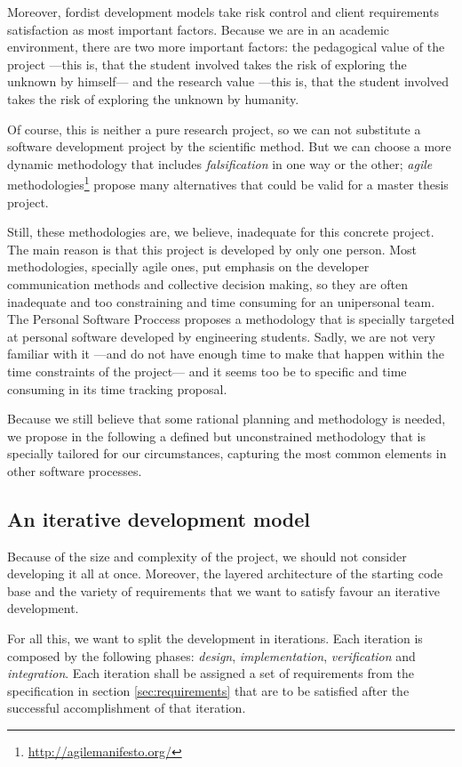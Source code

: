 Moreover, fordist development models take risk control and client
requirements satisfaction as most important factors. Because we are in
an academic environment, there are two more important factors: the
pedagogical value of the project ---this is, that the student involved
takes the risk of exploring the unknown by himself--- and the research
value ---this is, that the student involved takes the risk of
exploring the unknown by humanity.

Of course, this is neither a pure research project, so we can not
substitute a software development project by the scientific
method. But we can choose a more dynamic methodology that includes
\emph{falsification} in one way or the other; \emph{agile}
methodologies\footnote{\url{http://agilemanifesto.org/}} propose many
alternatives that could be valid for a master thesis project.

Still, these methodologies are, we believe, inadequate for this
concrete project. The main reason is that this project is developed by
only one person. Most methodologies, specially agile ones, put
emphasis on the developer communication methods and collective
decision making, so they are often inadequate and too constraining and
time consuming for an unipersonal team.  The Personal Software
Proccess \cite{watts96psp} proposes a methodology that is specially
targeted at personal software developed by engineering
students. Sadly, we are not very familiar with it ---and do not have
enough time to make that happen within the time constraints of the
project--- and it seems too be to specific and time consuming in its
time tracking proposal.

Because we still believe that some rational planning and methodology
is needed, we propose in the following a defined but unconstrained
methodology that is specially tailored for our circumstances,
capturing the most common elements in other software processes.

\subsection{An iterative development model}

Because of the size and complexity of the project, we should not
consider developing it all at once. Moreover, the layered architecture
of the starting code base and the variety of requirements that we want
to satisfy favour an iterative development.

For all this, we want to split the development in iterations. Each
iteration is composed by the following phases:  \emph{design},
\emph{implementation}, \emph{verification} and
\emph{integration}. Each iteration shall be assigned a set of
requirements from the specification in section \ref{sec:requirements}
that are to be satisfied after the successful accomplishment of that
iteration.

